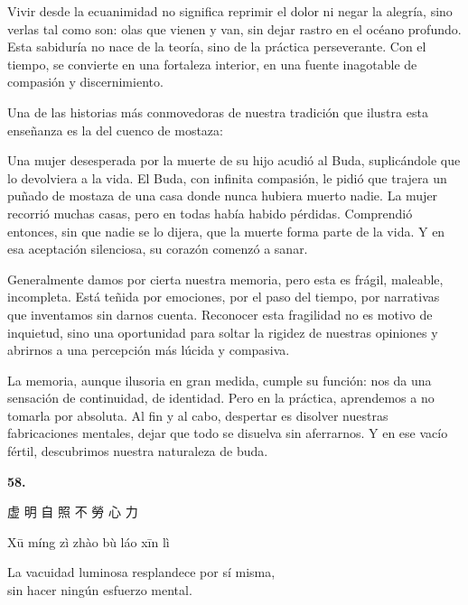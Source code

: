 \documentclass[
  a5paperpaper,
]{article}
\begin{document}
Vivir desde la ecuanimidad no significa reprimir el dolor ni negar la
alegría, sino verlas tal como son: olas que vienen y van, sin dejar
rastro en el océano profundo. Esta sabiduría no nace de la teoría, sino
de la práctica perseverante. Con el tiempo, se convierte en una
fortaleza interior, en una fuente inagotable de compasión y
discernimiento.

Una de las historias más conmovedoras de nuestra tradición que ilustra
esta enseñanza es la del cuenco de mostaza:

Una mujer desesperada por la muerte de su hijo acudió al Buda,
suplicándole que lo devolviera a la vida. El Buda, con infinita
compasión, le pidió que trajera un puñado de mostaza de una casa donde
nunca hubiera muerto nadie. La mujer recorrió muchas casas, pero en
todas había habido pérdidas. Comprendió entonces, sin que nadie se lo
dijera, que la muerte forma parte de la vida. Y en esa aceptación
silenciosa, su corazón comenzó a sanar.

Generalmente damos por cierta nuestra memoria, pero esta es frágil,
maleable, incompleta. Está teñida por emociones, por el paso del tiempo,
por narrativas que inventamos sin darnos cuenta. Reconocer esta
fragilidad no es motivo de inquietud, sino una oportunidad para soltar
la rigidez de nuestras opiniones y abrirnos a una percepción más lúcida
y compasiva.

La memoria, aunque ilusoria en gran medida, cumple su función: nos da
una sensación de continuidad, de identidad. Pero en la práctica,
aprendemos a no tomarla por absoluta. Al fin y al cabo, despertar es
disolver nuestras fabricaciones mentales, dejar que todo se disuelva sin
aferrarnos. Y en ese vacío fértil, descubrimos nuestra naturaleza de
buda.

\hfill\break

\hypertarget{03}{}
\begin{verseblock}

\newpage

\begin{center}\textbf{58.}\end{center}

虚 明 自 照 不 勞 心 力

Xū míng zì zhào bù láo xīn lì

La vacuidad luminosa resplandece por sí misma,\\
sin hacer ningún esfuerzo mental.

\end{verseblock}
\end{document}
